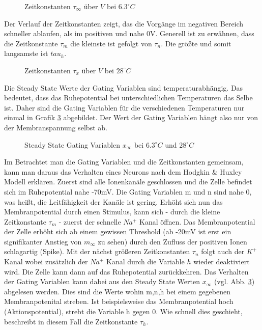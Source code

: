 \documentclass[conference]{IEEEtran}
\begin{document}
\begin{figure}[h!]
  	\centering
    \scalebox{.6}{}
    \caption{Zeitkonstanten $\tau_\infty$ über $V$ bei $6.3^\circ C$}
    \label{fig:Zeitkonstanten6}
\end{figure}

Der Verlauf der Zeitkonstanten zeigt, das die Vorgänge im negativen Bereich schneller ablaufen, als im positiven und nahe 0V. Generell ist zu erwähnen, dass die Zeitkonstante $\tau_m$ die kleinste ist gefolgt von $\tau_n$. Die größte und somit langsamste ist $tau_h$.
\begin{figure}[h!]
  	\centering
    \scalebox{.6}{}
    \caption{Zeitkonstanten $\tau_x$ über $V$ bei $28^\circ C$}
    \label{fig:Zeitkonstanten28}
\end{figure}


Die Steady State Werte der Gating Variablen sind temperaturabhängig. Das bedeutet, dass das Ruhepotential bei unterschiedlichen Temperaturen das Selbe ist. Daher sind die Gating Variablen für die verschiedenen Temperaturen nur einmal in Grafik \ref{fig:Gating1} abgebildet. Der Wert der Gating Variablen hängt also nur von der Membranspannung selbst ab.
\begin{figure}[h!]
  	\centering
    \scalebox{.6}{}
    \caption{Steady State Gating Variablen $x_\infty$ bei $6.3^\circ C$ und $28^\circ C$}
    \label{fig:Gating1}
\end{figure}
Im Betrachtet man die Gating Variablen und die Zeitkonstanten gemeinsam, kann man daraus das Verhalten eines Neurons nach dem Hodgkin \& Huxley Modell erklären. Zuerst sind alle Ionenkanäle geschlossen und die Zelle befindet sich im Ruhepotential nahe -70mV. Die Gating Variablen m und n sind nahe 0, was heißt, die Leitfähigkeit der Kanäle ist gering. Erhöht sich nun das Membranpotential durch einen Stimulus, kann sich - durch die kleine Zeitkonstante $\tau_m$ - zuerst der schnelle $Na^+$ Kanal öffnen. Das Membranpotential der Zelle erhöht sich ab einem gewissen Threshold (ab -20mV ist erst ein signifikanter Anstieg von $m_\infty$ zu sehen) durch den Zufluss der positiven Ionen schlagartig (Spike). Mit der nächst größeren Zeitkonstanten $\tau_n$ folgt auch der $K^+$ Kanal wobei zusätzlich der $Na^+$ Kanal durch die Variable $h$ wieder deaktiviert wird. Die Zelle kann dann auf das Ruhepotential zurückkehren. Das Verhalten der Gating Variablen kann dabei aus den Steady State Werten $x_\infty$ (vgl. Abb. \ref{fig:Gating1}) abgelesen werden. Dies sind die Werte wohin m,n,h bei einem gegebenen Membranpotenital streben. Ist beispielsweise das Membranpotential hoch (Aktionspotential), strebt die Variable h gegen 0. Wie schnell dies geschieht, beschreibt in diesem Fall die Zeitkonstante $\tau_h$.
\end{document}
